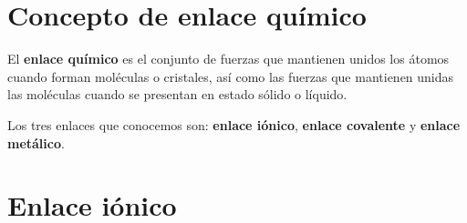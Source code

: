 

\section{Concepto de enlace químico}\label{sec:concepto-de-enlace-quimico}


    \begin{definition}
        El \textbf{enlace químico} es el conjunto de fuerzas que mantienen unidos los átomos cuando forman moléculas o cristales, así como las fuerzas que mantienen unidas las moléculas cuando se presentan en estado sólido o líquido.
    \end{definition}

Los tres enlaces que conocemos son: \textbf{enlace iónico}, \textbf{enlace covalente} y \textbf{enlace metálico}.

%
%


\section{Enlace iónico}\label{sec:enlace-ionico}


